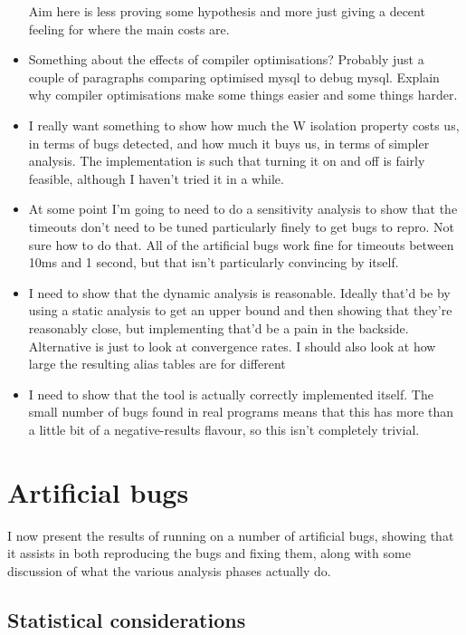 \begin{itemize}
  Aim here is less proving some hypothesis and more just giving a
  decent feeling for where the main costs are.
\item Something about the effects of compiler optimisations?  Probably
  just a couple of paragraphs comparing optimised mysql to debug
  mysql.  Explain why compiler optimisations make some things easier
  and some things harder.
\item I really want something to show how much the W isolation
  property costs us, in terms of bugs detected, and how much it buys
  us, in terms of simpler analysis.  The implementation is such that
  turning it on and off is fairly feasible, although I haven't tried
  it in a while.
\item At some point I'm going to need to do a sensitivity analysis to
  show that the timeouts don't need to be tuned particularly finely to
  get bugs to repro.  Not sure how to do that.  All of the artificial
  bugs work fine for timeouts between 10ms and 1 second, but that
  isn't particularly convincing by itself.
\item I need to show that the dynamic analysis is reasonable.  Ideally
  that'd be by using a static analysis to get an upper bound and then
  showing that they're reasonably close, but implementing that'd be a
  pain in the backside.  Alternative is just to look at convergence
  rates.  I should also look at how large the resulting alias tables
  are for different 
\item I need to show that the tool is actually correctly implemented
  itself.  The small number of bugs found in real programs means that
  this has more than a little bit of a negative-results flavour, so
  this isn't completely trivial.
\end{itemize}

\section{Artificial bugs}

I now present the results of running {\implementation} on a number of
artificial bugs, showing that it assists in both reproducing the bugs
and fixing them, along with some discussion of what the various
analysis phases actually do.

\subsection{Statistical considerations}


